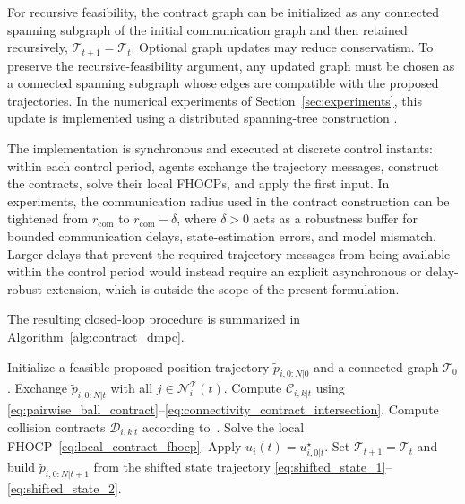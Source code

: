 \documentclass[letterpaper, 10 pt, conference]{ieeeconf}  %
\begin{document}
For recursive feasibility, the contract graph can be initialized as any
connected spanning subgraph of the initial communication graph and then retained
recursively, $\mathcal{T}_{t+1}=\mathcal{T}_t$. Optional graph updates may reduce
conservatism. To preserve the recursive-feasibility argument, any updated graph
must be chosen as a connected spanning subgraph whose edges are compatible with
the proposed trajectories. In the numerical experiments of Section~\ref{sec:experiments}, this update is
implemented using a distributed spanning-tree construction
\cite{gallager1983distributed,pandurangan2017time}.




The implementation is synchronous and executed at discrete control instants:
within each control period, agents exchange the trajectory messages, construct
the contracts, solve their local FHOCPs, and apply the first input.
In experiments, the communication
radius used in the contract construction can be tightened from
$r_{\mathrm{com}}$ to $r_{\mathrm{com}}-\delta$, where $\delta>0$ acts as a
robustness buffer for bounded communication delays, state-estimation errors,
and model mismatch. Larger delays that prevent the required trajectory messages
from being available within the control period would instead require an
explicit asynchronous or delay-robust extension, which is outside the scope of
the present formulation.

The resulting closed-loop procedure is summarized in
Algorithm~\ref{alg:contract_dmpc}.

\begin{algorithm}[t]
	\caption{Contract-based distributed MPC executed by agent $i$}
	\label{alg:contract_dmpc}
	\begin{algorithmic}[1]
		\State Initialize a feasible proposed position trajectory $\tilde p_{i,0:N|0}$ and a connected graph $\mathcal{T}_0$.
		\State Exchange $\tilde p_{i,0:N|t}$ with all
		$j\in\mathcal{N}^{\mathcal{T}}_i(t)$.
		\State Compute $\mathcal{C}_{i,k|t}$ using
		\eqref{eq:pairwise_ball_contract}--\eqref{eq:connectivity_contract_intersection}.
		\State Compute collision contracts $\mathcal{D}_{i,k|t}$ according to~\cite{bodmer2026anytime}.
		\State Solve the local FHOCP~\eqref{eq:local_contract_fhocp}.
		\State Apply $u_i(t)=u^\star_{i,0|t}$.
		\State Set $\mathcal{T}_{t+1}=\mathcal{T}_t$ and build
		$\tilde p_{i,0:N|t+1}$ from the shifted state trajectory \eqref{eq:shifted_state_1}--\eqref{eq:shifted_state_2}.
		\EndFor
	\end{algorithmic}
\end{algorithm}
\end{document}
